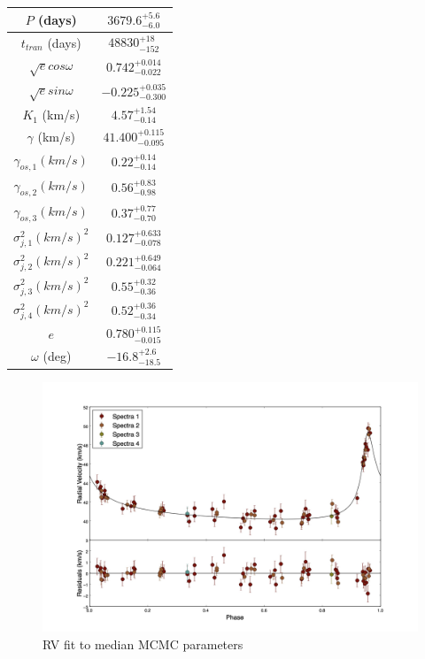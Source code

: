 \documentclass{article}
\begin{document}
\begin{table}
\centering
\begin{tabular}{| c | c |}
\hline
$P$ (days) & $3679.6^{+5.6}_{-6.0}$ \\
\hline
$t_{tran}$ (days) & $48830^{+18}_{-152}$ \\
\hline
$\sqrt{e} cos\omega$ & $0.742^{+0.014}_{-0.022}$ \\
\hline
$\sqrt{e} sin\omega$ & $-0.225^{+0.035}_{-0.300}$ \\
\hline
$K_1$ (km/s) & $4.57^{+1.54}_{-0.14}$ \\
\hline
$\gamma$ (km/s) & $41.400^{+0.115}_{-0.095}$ \\
\hline
$\gamma_{os,1} (km/s)$ & $0.22^{+0.14}_{-0.14}$ \\
\hline
$\gamma_{os,2} (km/s)$ & $0.56^{+0.83}_{-0.98}$ \\
\hline
$\gamma_{os,3} (km/s)$ & $0.37^{+0.77}_{-0.70}$ \\
\hline
$\sigma^2_{j,1} (km/s)^2$ & $0.127^{+0.633}_{-0.078}$ \\
\hline
$\sigma^2_{j,2} (km/s)^2$ & $0.221^{+0.649}_{-0.064}$ \\
\hline
$\sigma^2_{j,3} (km/s)^2$ & $0.55^{+0.32}_{-0.36}$ \\
\hline
$\sigma^2_{j,4} (km/s)^2$ & $0.52^{+0.36}_{-0.34}$ \\
\hline
$e$ & $0.780^{+0.115}_{-0.015}$ \\
\hline
$\omega$ (deg) & $-16.8^{+2.6}_{-18.5}$ \\
\hline
\end{tabular}
\end{table}

\begin{figure}[!htb]
\centering
\includegraphics[width=\textwidth]{RVfit_10000.jpg}
\caption{RV fit to median MCMC parameters}
\end{figure}
\end{document}
